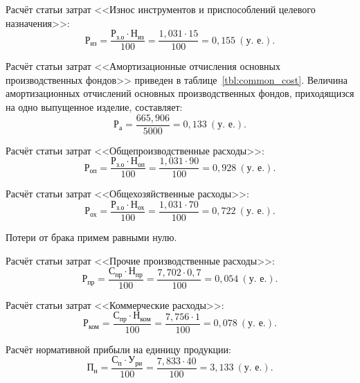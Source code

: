 Расчёт статьи затрат 
<<Износ инструментов и приспособлений целевого назначения>>:
\begin{equation*}
\text{Р}_{\text{из}} = 
\dfrac{
  \text{Р}_{\text{з.о}} \cdot \text{Н}_{\text{из}}
}{
  100
} =
\dfrac{1{,}031 \cdot 15}{100} =
0{,}155 \: (\text{у.~е.}).
\end{equation*}

Расчёт статьи затрат 
<<Амортизационные отчисления основных производственных фондов>> 
приведен в таблице~\ref{tbl:common_cost}.
Величина амортизационных отчислений основных производственных фондов,
приходящизся на одно выпущенное изделие, составляет: 
\begin{equation*}
\text{Р}_{\text{а}} = 
\dfrac{665{,}906}{5000} =
0{,}133 \: (\text{у.~е.}).
\end{equation*}

Расчёт статьи затрат 
<<Общепроизводственные расходы>>:
\begin{equation*}
\text{Р}_{\text{оп}} = 
\dfrac{
  \text{Р}_{\text{з.о}} \cdot \text{Н}_{\text{оп}}
}{
  100
} =
\dfrac{1{,}031 \cdot 90}{100} =
0{,}928 \: (\text{у.~е.}).
\end{equation*}

Расчёт статьи затрат 
<<Общехозяйственные расходы>>:
\begin{equation*}
\text{Р}_{\text{ох}} = 
\dfrac{
  \text{Р}_{\text{з.о}} \cdot \text{Н}_{\text{ох}}
}{
  100
} =
\dfrac{1{,}031 \cdot 70}{100} =
0{,}722 \: (\text{у.~е.}).
\end{equation*}

Потери от брака примем равными нулю.

Расчёт статьи затрат 
<<Прочие производственные расходы>>:
\begin{equation*}
\text{Р}_{\text{пр}} = 
\dfrac{
  \text{С}_{\text{пр}} \cdot \text{Н}_{\text{пр}}
}{
  100
} =
\dfrac{7{,}702 \cdot 0{,}7}{100} =
0{,}054 \: (\text{у.~е.}).
\end{equation*}

Расчёт статьи затрат
<<Коммерческие расходы>>:
\begin{equation*}
\text{Р}_{\text{ком}} = 
\dfrac{
  \text{С}_{\text{пр}} \cdot \text{Н}_{\text{ком}}
}{
  100
} =
\dfrac{7{,}756 \cdot 1}{100} =
0{,}078 \: (\text{у.~е.}).
\end{equation*}

Расчёт нормативной прибыли на единицу продукции:
\begin{equation*}
\text{П}_{\text{н}} = 
\dfrac{
  \text{С}_{\text{п}} \cdot \text{У}_{\text{ри}}
}{
  100
} =
\dfrac{7{,}833 \cdot 40}{100} =
3{,}133 \: (\text{у.~е.}).
\end{equation*}

